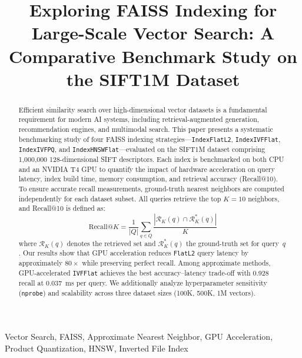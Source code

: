 \documentclass[conference]{IEEEtran}
\begin{document}
\title{Exploring FAISS Indexing for Large-Scale Vector Search: A Comparative Benchmark Study on the SIFT1M Dataset}

\author{
}

\maketitle

\begin{abstract}
Efficient similarity search over high-dimensional vector datasets is a fundamental requirement for modern AI systems, including retrieval-augmented generation, recommendation engines, and multimodal search. This paper presents a systematic benchmarking study of four FAISS indexing strategies---\texttt{IndexFlatL2}, \texttt{IndexIVFFlat}, \texttt{IndexIVFPQ}, and \texttt{IndexHNSWFlat}---evaluated on the SIFT1M dataset comprising 1,000,000 128-dimensional SIFT descriptors. Each index is benchmarked on both CPU and an NVIDIA T4 GPU to quantify the impact of hardware acceleration on query latency, index build time, memory consumption, and retrieval accuracy (Recall@10). To ensure accurate recall measurements, ground-truth nearest neighbors are computed independently for each dataset subset. All queries retrieve the top $K\!=\!10$ neighbors, and Recall@10 is defined as:
\begin{equation}
\text{Recall@}K = \frac{1}{|Q|}\sum_{q\in Q}\frac{|\mathcal{R}_K(q)\cap\mathcal{R}_K^{*}(q)|}{K}
\end{equation}
where $\mathcal{R}_K(q)$ denotes the retrieved set and $\mathcal{R}_K^{*}(q)$ the ground-truth set for query~$q$. Our results show that GPU acceleration reduces \texttt{FlatL2} query latency by approximately $80\times$ while preserving perfect recall. Among approximate methods, GPU-accelerated \texttt{IVFFlat} achieves the best accuracy--latency trade-off with 0.928 recall at 0.037~ms per query. We additionally analyze hyperparameter sensitivity (\texttt{nprobe}) and scalability across three dataset sizes (100K, 500K, 1M vectors).
\end{abstract}

\begin{IEEEkeywords}
Vector Search, FAISS, Approximate Nearest Neighbor, GPU Acceleration, Product Quantization, HNSW, Inverted File Index
\end{IEEEkeywords}
\end{document}
